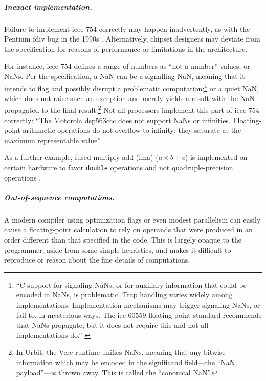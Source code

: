 \documentclass[twoside]{article}
\begin{document}
\subparagraph{Inexact implementation.}

Failure to implement {\sc ieee} 754 correctly may happen inadvertently, as with the Pentium {\sc fdiv} bug in the 1990s \citep{Edelman1997}.  Alternatively, chipset designers may deviate from the specification for reasons of performance or limitations in the architecture.

For instance, {\sc ieee} 754 defines a range of numbers as “not-a-number” values, or NaNs.  Per the specification, a NaN can be a signalling NaN, meaning that it intends to flag and possibly disrupt a problematic computation;\footnote{“C support for signaling NaNs, or for auxiliary information that could be encoded in NaNs, is problematic.  Trap handling varies widely among implementations. Implementation mechanisms may trigger signaling NaNs, or fail to, in mysterious ways.  The {\sc iec} 60559 floating-point standard recommends that NaNs propagate; but it does not require this and not all implementations do.”  \citetext{\citet{Jones2008}, p.~339}} or a quiet NaN, which does not raise such an exception and merely yields a result with the NaN propagated to the final result.\footnote{In Urbit, the Vere runtime unifies NaNs, meaning that any bitwise information which may be encoded in the significand field—the “NaN payload”—is thrown away.  This is called the ``canonical NaN''.}  Not all processors implement this part of {\sc ieee} 754 correctly:  “The Motorola {\sc dsp563ccc} does not support NaNs or infinities.  Floating-point arithmetic operations do not overflow to infinity; they saturate at the maximum representable value” \citetext{\citet{Jones2008}, p.~338}.

As a further example, fused multiply-add ({\sc fma}) ($a \times b + c$) is implemented on certain hardware to favor \texttt{double} operations and not quadruple-precision operations \citetext{\citet{Kahan1997}, p.~5}.

\subparagraph{Out-of-sequence computations.}

A modern compiler using optimization flags or even modest parallelism can easily cause a floating-point calculation to rely on operands that were produced in an order different than that specified in the code.  This is largely opaque to the programmer, aside from some simple heuristics, and makes it difficult to reproduce or reason about the fine details of computations.
\end{document}
